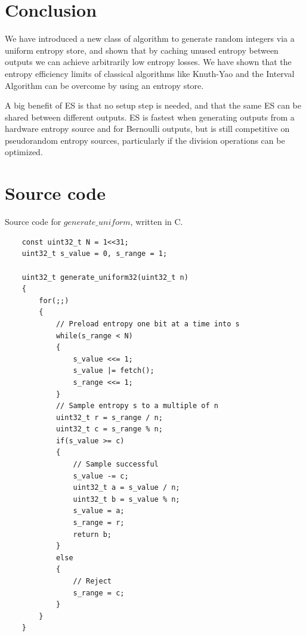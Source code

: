 \documentclass[12pt]{article}
\begin{document}
\section{Conclusion}

We have introduced a new class of algorithm to generate random integers via a uniform entropy store, and shown that by caching unused entropy between outputs we can achieve arbitrarily low entropy losses. We have shown that the entropy efficiency limits of classical algorithms like Knuth-Yao and the Interval Algorithm can be overcome by using an entropy store. 

A big benefit of ES is that no setup step is needed, and that the same ES can be shared between different outputs. ES is fastest when generating outputs from a hardware entropy source and for Bernoulli outputs, but is still competitive on pseudorandom entropy sources, particularly if the division operations can be optimized.



\printbibliography

\appendix

\section {Source code} \label{app:source-code}

Source code for $generate\_uniform$, written in C.

\begin{verbatim}
    const uint32_t N = 1<<31;
    uint32_t s_value = 0, s_range = 1;

    uint32_t generate_uniform32(uint32_t n)
    {
        for(;;)
        {
            // Preload entropy one bit at a time into s
            while(s_range < N)
            {
                s_value <<= 1;
                s_value |= fetch();
                s_range <<= 1;
            }
            // Sample entropy s to a multiple of n
            uint32_t r = s_range / n;
            uint32_t c = s_range % n;
            if(s_value >= c)
            {
                // Sample successful
                s_value -= c;
                uint32_t a = s_value / n;
                uint32_t b = s_value % n;
                s_value = a;
                s_range = r; 
                return b;
            }
            else
            {
                // Reject
                s_range = c;
            }
        }
    }
\end{verbatim}
\end{document}
